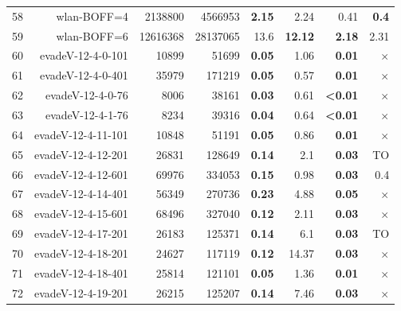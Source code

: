 \begin{longtable}{lrr@{\hskip 12pt}r@{\hskip 12pt}r@{\hskip 12pt}r@{\hskip 12pt}r@{\hskip 12pt}r}
58 & \multirow{1}{*}{wlan-BOFF=4} & \multirow{1}{*}{2138800} & \multirow{1}{*}{4566953} & \textbf{2.15} & 2.24 & 0.41 & \textbf{0.4} \\
59 & \multirow{1}{*}{wlan-BOFF=6} & \multirow{1}{*}{12616368} & \multirow{1}{*}{28137065} & 13.6 & \textbf{12.12} & \textbf{2.18} & 2.31 \\
\midrule
60 & \multirow{1}{*}{evadeV-12-4-0-101} & \multirow{1}{*}{10899} & \multirow{1}{*}{51699} & \textbf{0.05} & 1.06 & \textbf{0.01} & $\times$ \\
61 & \multirow{1}{*}{evadeV-12-4-0-401} & \multirow{1}{*}{35979} & \multirow{1}{*}{171219} & \textbf{0.05} & 0.57 & \textbf{0.01} & $\times$ \\
62 & \multirow{1}{*}{evadeV-12-4-0-76} & \multirow{1}{*}{8006} & \multirow{1}{*}{38161} & \textbf{0.03} & 0.61 & \textbf{<0.01} & $\times$ \\
63 & \multirow{1}{*}{evadeV-12-4-1-76} & \multirow{1}{*}{8234} & \multirow{1}{*}{39316} & \textbf{0.04} & 0.64 & \textbf{<0.01} & $\times$ \\
64 & \multirow{1}{*}{evadeV-12-4-11-101} & \multirow{1}{*}{10848} & \multirow{1}{*}{51191} & \textbf{0.05} & 0.86 & \textbf{0.01} & $\times$ \\
65 & \multirow{1}{*}{evadeV-12-4-12-201} & \multirow{1}{*}{26831} & \multirow{1}{*}{128649} & \textbf{0.14} & 2.1 & \textbf{0.03} & TO \\
66 & \multirow{1}{*}{evadeV-12-4-12-601} & \multirow{1}{*}{69976} & \multirow{1}{*}{334053} & \textbf{0.15} & 0.98 & \textbf{0.03} & 0.4 \\
67 & \multirow{1}{*}{evadeV-12-4-14-401} & \multirow{1}{*}{56349} & \multirow{1}{*}{270736} & \textbf{0.23} & 4.88 & \textbf{0.05} & $\times$ \\
68 & \multirow{1}{*}{evadeV-12-4-15-601} & \multirow{1}{*}{68496} & \multirow{1}{*}{327040} & \textbf{0.12} & 2.11 & \textbf{0.03} & $\times$ \\
69 & \multirow{1}{*}{evadeV-12-4-17-201} & \multirow{1}{*}{26183} & \multirow{1}{*}{125371} & \textbf{0.14} & 6.1 & \textbf{0.03} & TO \\
70 & \multirow{1}{*}{evadeV-12-4-18-201} & \multirow{1}{*}{24627} & \multirow{1}{*}{117119} & \textbf{0.12} & 14.37 & \textbf{0.03} & $\times$ \\
71 & \multirow{1}{*}{evadeV-12-4-18-401} & \multirow{1}{*}{25814} & \multirow{1}{*}{121101} & \textbf{0.05} & 1.36 & \textbf{0.01} & $\times$ \\
72 & \multirow{1}{*}{evadeV-12-4-19-201} & \multirow{1}{*}{26215} & \multirow{1}{*}{125207} & \textbf{0.14} & 7.46 & \textbf{0.03} & $\times$ \\

\end{longtable}
